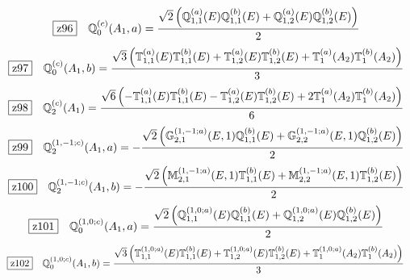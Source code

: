 \documentclass[fleqn,10pt,landscape]{jsarticle}
\begin{document}
\begin{dmath*}
\hspace*{3mm}\fbox{z96}\quad \mathbb{Q}_{0}^{(c)}(A_{1},a)=\frac{\sqrt{2} \left(\mathbb{Q}_{1,1}^{(a)}(E) \mathbb{Q}_{1,1}^{(b)}(E) + \mathbb{Q}_{1,2}^{(a)}(E) \mathbb{Q}_{1,2}^{(b)}(E)\right)}{2}
\end{dmath*}
\begin{dmath*}
\hspace*{3mm}\fbox{z97}\quad \mathbb{Q}_{0}^{(c)}(A_{1},b)=\frac{\sqrt{3} \left(\mathbb{T}_{1,1}^{(a)}(E) \mathbb{T}_{1,1}^{(b)}(E) + \mathbb{T}_{1,2}^{(a)}(E) \mathbb{T}_{1,2}^{(b)}(E) + \mathbb{T}_{1}^{(a)}(A_{2}) \mathbb{T}_{1}^{(b)}(A_{2})\right)}{3}
\end{dmath*}
\begin{dmath*}
\hspace*{3mm}\fbox{z98}\quad \mathbb{Q}_{2}^{(c)}(A_{1})=\frac{\sqrt{6} \left(- \mathbb{T}_{1,1}^{(a)}(E) \mathbb{T}_{1,1}^{(b)}(E) - \mathbb{T}_{1,2}^{(a)}(E) \mathbb{T}_{1,2}^{(b)}(E) + 2 \mathbb{T}_{1}^{(a)}(A_{2}) \mathbb{T}_{1}^{(b)}(A_{2})\right)}{6}
\end{dmath*}
\begin{dmath*}
\hspace*{3mm}\fbox{z99}\quad \mathbb{Q}_{2}^{(1,-1;c)}(A_{1},a)=- \frac{\sqrt{2} \left(\mathbb{G}_{2,1}^{(1,-1;a)}(E,1) \mathbb{Q}_{1,1}^{(b)}(E) + \mathbb{G}_{2,2}^{(1,-1;a)}(E,1) \mathbb{Q}_{1,2}^{(b)}(E)\right)}{2}
\end{dmath*}
\begin{dmath*}
\hspace*{3mm}\fbox{z100}\quad \mathbb{Q}_{2}^{(1,-1;c)}(A_{1},b)=- \frac{\sqrt{2} \left(\mathbb{M}_{2,1}^{(1,-1;a)}(E,1) \mathbb{T}_{1,1}^{(b)}(E) + \mathbb{M}_{2,2}^{(1,-1;a)}(E,1) \mathbb{T}_{1,2}^{(b)}(E)\right)}{2}
\end{dmath*}
\begin{dmath*}
\hspace*{3mm}\fbox{z101}\quad \mathbb{Q}_{0}^{(1,0;c)}(A_{1},a)=\frac{\sqrt{2} \left(\mathbb{Q}_{1,1}^{(1,0;a)}(E) \mathbb{Q}_{1,1}^{(b)}(E) + \mathbb{Q}_{1,2}^{(1,0;a)}(E) \mathbb{Q}_{1,2}^{(b)}(E)\right)}{2}
\end{dmath*}
\begin{dmath*}
\hspace*{3mm}\fbox{z102}\quad \mathbb{Q}_{0}^{(1,0;c)}(A_{1},b)=\frac{\sqrt{3} \left(\mathbb{T}_{1,1}^{(1,0;a)}(E) \mathbb{T}_{1,1}^{(b)}(E) + \mathbb{T}_{1,2}^{(1,0;a)}(E) \mathbb{T}_{1,2}^{(b)}(E) + \mathbb{T}_{1}^{(1,0;a)}(A_{2}) \mathbb{T}_{1}^{(b)}(A_{2})\right)}{3}
\end{dmath*}
\end{document}
